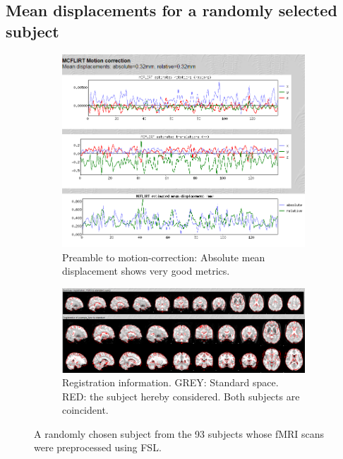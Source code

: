	\FloatBarrier
	
	\clearpage
	
	

	
	\subsection{Mean displacements for a randomly selected subject} \label{meandisplacements_registre}
		\FloatBarrier
		\begin{figure}[h]
			\centering
			\begin{subfigure}[a]{0.80\textwidth}
				\includegraphics[width=1\textwidth]{fig_mean_displacements_annex.png}
				\caption{Preamble to motion-correction: Absolute mean displacement shows very good metrics.}
				\label{fig_mean_displacements_annex} 
			\end{subfigure}
			\begin{subfigure}[b]{0.80\textwidth}
				\includegraphics[width=1\textwidth]{fig_registre_cervellets.png}
				\caption{Registration information. GREY: Standard space. RED: the subject hereby considered. Both subjects are coincident.}
				\label{fig_registre_cervellets} 
			\end{subfigure}
			\caption{A randomly chosen subject from the 93 subjects whose fMRI scans were preprocessed using FSL.}
		\end{figure}
		\FloatBarrier
		\clearpage




